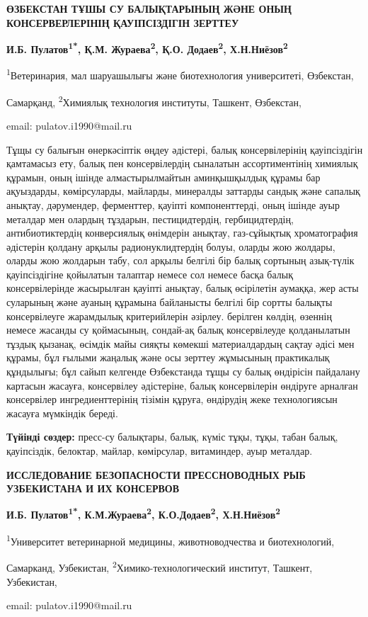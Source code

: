 \begin{center}
{\large\bfseries ӨЗБЕКСТАН ТҰШЫ СУ БАЛЫҚТАРЫНЫҢ ЖӘНЕ ОНЫҢ КОНСЕРВЕРЛЕРІНІҢ
ҚАУІПСІЗДІГІН ЗЕРТТЕУ}

\vspace{1em}
{\bfseries И.Б. Пулатов\textsuperscript{1*}, Қ.М.
Жураева\textsuperscript{2}, Қ.О. Додаев\textsuperscript{2},
Х.Н.Ниёзов\textsuperscript{2}}

\textsuperscript{1}Ветеринария, мал шаруашылығы және биотехнология
университеті, Өзбекстан,

Самарқанд, \textsuperscript{2}Химиялық технология институты, Ташкент,
Өзбекстан,

email: pulatov.i1990@mail.ru
\end{center}

Тұщы су балығын өнеркәсіптік өңдеу әдістері, балық консервілерінің
қауіпсіздігін қамтамасыз ету, балық пен консервілердің сыналатын
ассортиментінің химиялық құрамын, оның ішінде алмастырылмайтын
аминқышқылдық құрамы бар ақуыздарды, көмірсуларды, майларды, минералды
заттарды сандық және сапалық анықтау, дәрумендер, ферменттер, қауіпті
компоненттерді, оның ішінде ауыр металдар мен олардың тұздарын,
пестицидтердің, гербицидтердің, антибиотиктердің конверсиялық өнімдерін
анықтау, газ-сұйықтық хроматография әдістерін қолдану арқылы
радионуклидтердің болуы, оларды жою жолдары, оларды жою жолдарын табу,
сол арқылы белгілі бір балық сортының азық-түлік қауіпсіздігіне
қойылатын талаптар немесе сол немесе басқа балық консервілерінде
жасырылған қауіпті анықтау, балық өсірілетін аумаққа, жер асты суларының
және ауаның құрамына байланысты белгілі бір сортты балықты консервілеуге
жарамдылық критерийлерін әзірлеу. берілген көлдің, өзеннің немесе
жасанды су қоймасының, сондай-ақ балық консервілеуде қолданылатын тұздық
қызанақ, өсімдік майы сияқты көмекші материалдардың сақтау әдісі мен
құрамы, бұл ғылыми жаңалық және осы зерттеу жұмысының практикалық
құндылығы; бұл сайып келгенде Өзбекстанда тұщы су балық өндірісін
пайдалану картасын жасауға, консервілеу әдістеріне, балық консервілерін
өндіруге арналған консервілер ингредиенттерінің тізімін құруға,
өндірудің жеке технологиясын жасауға мүмкіндік береді.

{\bfseries Түйінді сөздер:} пресс-су балықтары, балық, күміс тұқы, тұқы,
табан балық, қауіпсіздік, белоктар, майлар, көмірсулар, витаминдер, ауыр
металдар.

\begin{center}
{\large\bfseries ИССЛЕДОВАНИЕ БЕЗОПАСНОСТИ ПРЕССНОВОДНЫХ РЫБ УЗБЕКИСТАНА И ИХ КОНСЕРВОВ}

\vspace{1em}
{\bfseries И.Б. Пулатов\textsuperscript{1*},
К.М.Жураева\textsuperscript{2}, К.О.Додаев\textsuperscript{2},
Х.Н.Ниёзов\textsuperscript{2}}

\textsuperscript{1}Университет ветеринарной медицины, животноводчества и
биотехнологий,

Самарканд, Узбекистан, \textsuperscript{2}Химико-технологический
институт, Ташкент, Узбекистан,

email: pulatov.i1990@mail.ru
\end{center}

